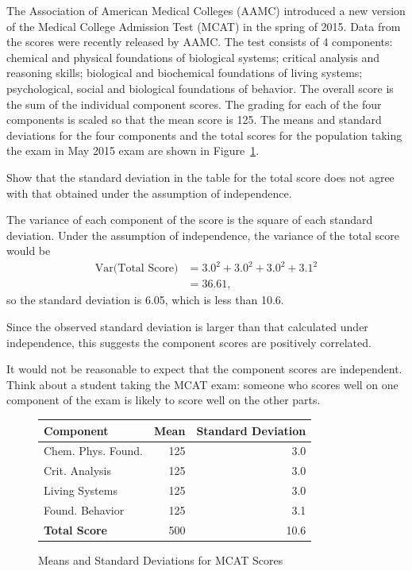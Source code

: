 \begin{examplewrap}
\begin{nexample}{The Association of American Medical Colleges (AAMC) introduced a new version of the Medical College Admission Test (MCAT) in the spring of 2015. Data from the scores were recently released by AAMC.\footnotemark{} The test consists of 4 components: chemical and physical foundations of biological systems; critical analysis and reasoning skills; biological and biochemical foundations of living systems; psychological, social and biological foundations of behavior. The overall score is the sum of the individual component scores. The grading for each of the four components is scaled so that the mean score is 125.  The means and standard deviations for the four components and the total scores for the population taking the exam in May 2015 exam are shown in Figure~\ref{table:mcatScoreDistribution}.

Show that the standard deviation in the table for the total score does not agree with that obtained under the assumption of independence.}
	The variance of each component of the score is the square of each standard deviation.  Under the assumption of independence, the variance of the total score would be 
	\begin{align*}
	\textrm{Var(Total Score)} &= 3.0^2 + 3.0^2 + 3.0^2 + 3.1^2 \\
	&= 36.61,
	\end{align*}
	so the standard deviation is 6.05, which is less than 10.6. 
	
	Since the observed standard deviation is larger than that calculated under independence, this suggests the component scores are positively correlated.
	
	It would not be reasonable to expect that the component scores are independent. Think about a student taking the MCAT exam: someone who scores well on one component of the exam is likely to score well on the other parts.
\end{nexample}
\end{examplewrap}

\begin{figure}[h]
	\centering
	\begin{tabular}{lrr}
		\hline
		\textbf{Component} & \textbf{Mean} & \textbf{Standard Deviation}\\
		\hline
		Chem. Phys. Found. &   125 &   3.0\\
		Crit. Analysis &   125 &    3.0 \\
		Living  Systems &  125 &     3.0\\
		Found. Behavior&   125 &     3.1\\
		\textbf{Total Score} &    500 &     10.6\\
		\hline
	\end{tabular}
	\caption{Means and Standard Deviations for MCAT Scores}
	\label{table:mcatScoreDistribution}
\end{figure}	

